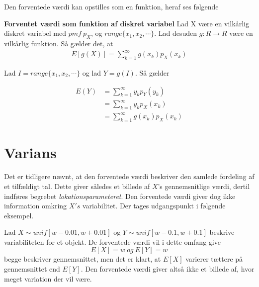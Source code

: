 Den forventede værdi kan opstilles som en funktion, heraf ses følgende

\begin{minipage}\textwidth
\begin{pro} \textbf{Forventet værdi som funktion af diskret variabel} %
\newline
Lad X være en vilkårlig diskret variabel med $pmf\  p_X$, og $range\{x_1,x_2,\cdots\}$. Lad desuden $g: R \to R$ være en vilkårlig funktion. Så gælder det, at
\begin{align}
    E[g(X)]=\sum_{k=1}^\infty g(x_k)p_X(x_k)
\end{align}
\end{pro}
\end{minipage}

\begin{bev}\textbf{} %
\newline
Lad $I = range\{x_1, x_2, \cdots\}$ og lad $Y = g(I)$. Så gælder

\begin{align*}
    E(Y)&=\sum_{k=1}^\infty y_k p_Y(y_k)\\
    &=\sum_{k=1}^\infty y_k p_X(x_k)\\
    &=\sum_{k=1}^\infty g(x_k)p_X(x_k)
\end{align*}
\end{bev}


\section{Varians} %
Det er tidligere nævnt, at den forventede værdi beskriver den samlede fordeling af et tilfældigt tal. Dette giver således et billede af $X$'s gennemsnitlige værdi, dertil indføres begrebet \textit{lokationsparameteret}. Den forventede værdi giver dog ikke information omkring $X's$ variabilitet. 
Der tages udgangspunkt i følgende eksempel.
\begin{eks}\textbf{}
\newline
Lad $X \sim  unif [w-0.01, w+0.01]$ og $Y  \sim unif[w-0.1, w+0.1]$ beskrive variabiliteten for et objekt. De forventede værdi vil i dette omfang give
$$E[X] = w \ og \ E[Y] = w$$
begge beskriver gennemsnittet, men det er klart, at $E[X]$ varierer tættere på gennemsnittet end $E[Y]$. Den forventede værdi giver altså ikke et billede af, hvor meget variation der vil være.\\
\end{eks}

